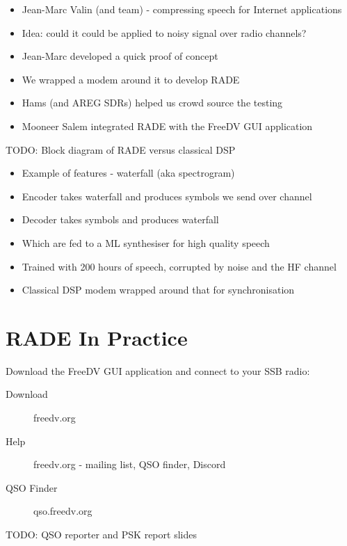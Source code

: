 \documentclass{beamer}
\begin{document}
\begin{frame}
\begin{itemize}
	\item Jean-Marc Valin (and team) - compressing speech for Internet applications
    \item Idea: could it could be applied to noisy signal over radio channels?
    \item Jean-Marc developed a quick proof of concept
    \item We wrapped a modem around it to develop RADE
    \item Hams (and AREG SDRs) helped us crowd source the testing
    \item Mooneer Salem integrated RADE with the FreeDV GUI application
\end{itemize}
\end{frame}

\begin{frame}
	TODO: Block diagram of RADE versus classical DSP
\end{frame}

\begin{frame}
\begin{itemize}
	\item Example of features - waterfall (aka spectrogram)
	\item Encoder takes waterfall and produces symbols we send over channel
	\item Decoder takes symbols and produces waterfall
	\item Which are fed to a ML synthesiser for high quality speech
	\item Trained with 200 hours of speech, corrupted by noise and the HF channel
	\item Classical DSP modem wrapped around that for synchronisation
\end{itemize}
\end{frame}

\section{RADE In Practice}

\begin{frame}
Download the FreeDV GUI application and connect to your SSB radio:
\begin{description}
    \item[Download] freedv.org 
    \item[Help] freedv.org - mailing list, QSO finder, Discord
    \item[QSO Finder] qso.freedv.org
\end{description}
\end{frame} 

\begin{frame}
   TODO: QSO reporter and PSK report slides
\end{frame}
\end{document}
